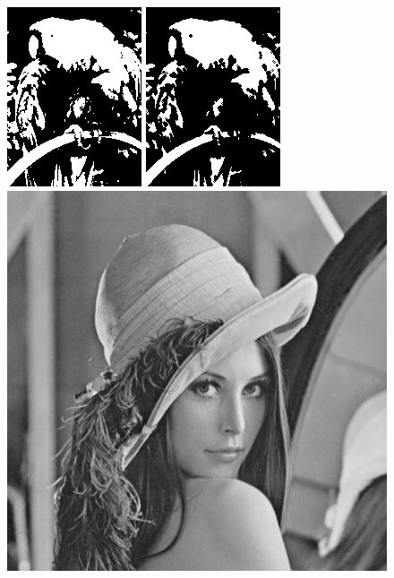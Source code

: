 \documentclass{article}
\begin{document}
\begin{figure}[!htb]
\centering
\includegraphics[scale=0.6]{img/papuga_1bit.png} 
\includegraphics[scale=0.6]{img/Dylatacja_Obrazu_papuga_1bit.png}\\
\includegraphics[scale=0.2]{img/lena_8bit.png}  

\end{figure}
\end{document}
